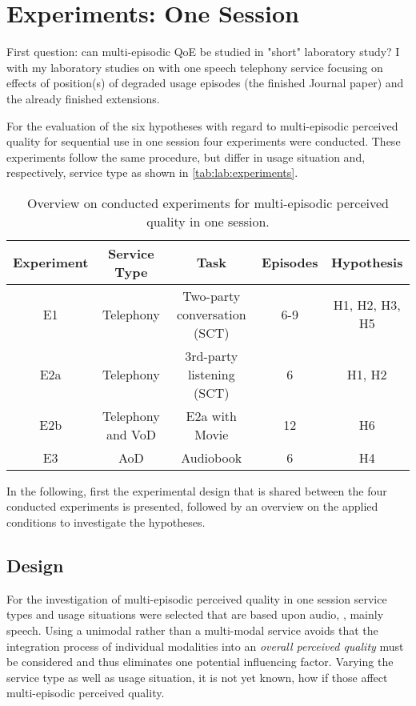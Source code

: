 \chapter{Experiments: One Session}\label{chap:lab}
\begin{chapter-abstract}
First question: can multi-episodic QoE be studied in "short" laboratory study?
I with my laboratory studies on with one speech telephony service focusing on effects of position(s) of degraded usage episodes (the finished Journal paper) and the already finished extensions.
\end{chapter-abstract}

For the evaluation of the six hypotheses with regard to multi-episodic perceived quality for sequential use in one session four experiments were conducted.
These experiments follow the same procedure, but differ in usage situation and, respectively, service type as shown in \autoref{tab:lab:experiments}.

\begin{table}[h]
	\begin{tabulary}{\textwidth}{C|C|C|C|C}
	Experiment	& Service Type 				& Task								& Episodes & Hypothesis \\
	\hline
	E1			& Telephony					& Two-party conversation (\ac{SCT})	& 6-9      & H1, H2, H3, H5 \\
	\hline
	E2a			& Telephony					& 3rd-party listening (\ac{SCT})	& 6        & H1, H2 \\
	\hline
	E2b			& Telephony and \ac{VoD}	& E2a with Movie					& 12       & H6\\
	\hline
	E3			& \ac{AoD}					& Audiobook							& 6        & H4\\
	\end{tabulary}
	\caption{Overview on conducted experiments for multi-episodic perceived quality in one session.}
	\label{tab:lab:experiments}
\end{table}

In the following, first the experimental design that is shared between the four conducted experiments is presented, followed by an overview on the applied conditions to investigate the hypotheses.

\section{Design}
For the investigation of multi-episodic perceived quality in one session service types and usage situations were selected that are based upon audio, \ie, mainly speech.
Using a unimodal rather than a multi-modal service avoids that the integration process of individual modalities into an \emph{overall perceived quality} must be considered and thus eliminates one potential influencing factor.
Varying the service type as well as usage situation, it is not yet known, how if those affect multi-episodic perceived quality.

